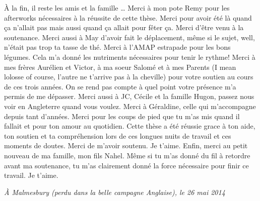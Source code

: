 \`A la fin, il reste les amis et la famille \ldots{}
Merci à mon pote Remy pour les afterworks nécessaires
à la réussite de cette thèse. Merci pour avoir été
là quand ça n'allait pas mais aussi quand ça
allait pour fêter ça. Merci d'être venu à la soutenance.
Merci aussi à May d'avoir fait le déplacement, même
si le sujet, well, n'était pas trop ta tasse de thé.
Merci à l'AMAP estrapade pour les bons légumes. Cela
m'a donné les nutriments nécessaires pour tenir le rythme!
Merci à mes frères Aurélien et Victor, à ma soeur Salomé et à mes
Parents (I mean lolosse of course, l'autre ne t'arrive pas
à la cheville) pour votre soutien au cours de ces trois années.
On se rend pas compte à quel point votre présence m'a permis de
me dépasser. Merci aussi à JC, Cécile et la famille Hugon, passez 
nous voir en Angleterre quand vous voulez. Merci à Géraldine, celle qui 
m'accompagne depuis tant d'années. Merci pour les coups
de pied que tu m'as mis quand il fallait et pour ton
amour au quotidien. Cette thèse a été réussie grace à ton aide,
ton soutien et ta compréhension lors de ces longues nuits 
de travail et ces moments de doutes. Merci de m’avoir soutenu. Je t'aime.
Enfin, merci au petit nouveau de ma famille, mon fils Nahel.
Même si tu m'as donné du fil à retordre avant ma soutenance,
tu m'as clairement donné la force nécessaire
pour finir ce travail. Je t'aime.

\begin{flushright}
\emph{\`A Malmesbury (perdu dans la belle campagne Anglaise), le 26 mai 2014}
\end{flushright}
